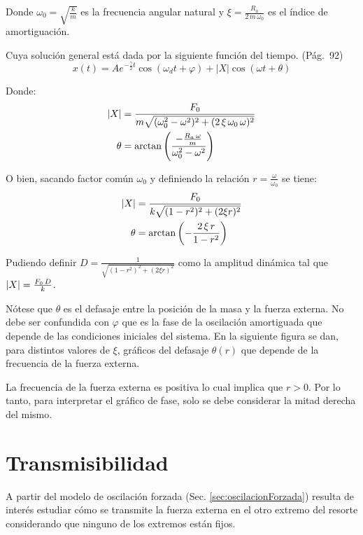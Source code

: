 Donde $\omega_0=\sqrt{\frac{k}{m}}$ es la frecuencia angular natural y $\xi=\frac{R_a}{2 \, m \, \omega_0}$ es el índice de amortiguación.

Cuya solución general está dada por la siguiente función del tiempo. \cite{1} (Pág.~92)
\begin{equation*}
    x(t) = A e^{-\tfrac{\gamma}{2}t} \cos{(\omega_d t + \varphi)} + |X| \cos (\omega t + \theta)
\end{equation*}

Donde:
\begin{align*}
    {\left| {X} \right|} &= \frac{F_0}{m \sqrt{(\omega_0^2-\omega^2)^2+(2 \, \xi \, \omega_0 \, \omega)^2}}
    \\
    \theta &= \arctan \left( \frac{-\frac{R_a \, \omega}{m}}{\omega_0^2 - \omega^2} \right)
\end{align*}

O bien, sacando factor común $\omega_0$ y definiendo la relación $r = \frac{\omega}{\omega_0}$ se tiene:
\begin{align*}
    {\left| {X} \right|} &= \frac{F_0}{k \sqrt{(1-r^2)^2+(2 \xi r)^2}}
    \\
    \theta &= \arctan \left( - \frac{2 \, \xi \, r}{1-r^2} \right)
\end{align*}

Pudiendo definir $D=\frac{1}{\sqrt{(1-r^2)^2+(2 \xi r)^2}}$ como la amplitud dinámica tal que ${\left| {X} \right|}=\frac{F_0 \, D}{k}$.

Nótese que $\theta$ es el defasaje entre la posición de la masa y la fuerza externa.
No debe ser confundida con $\varphi$ que es la fase de la oscilación amortiguada que depende de las condiciones iniciales del sistema.
En la siguiente figura se dan, para distintos valores de $\xi$, gráficos del defasaje $\theta(r)$ que depende de la frecuencia de la fuerza externa.

\begin{center}
    \def\svgwidth{\linewidth}
    
\end{center}

La frecuencia de la fuerza externa es positiva lo cual implica que $r>0$.
Por lo tanto, para interpretar el gráfico de fase, solo se debe considerar la mitad derecha del mismo.


\section{Transmisibilidad}

A partir del modelo de oscilación forzada (Sec. \ref{sec:oscilacionForzada}) resulta de interés estudiar cómo se transmite la fuerza externa en el otro extremo del resorte considerando que ninguno de los extremos están fijos.


